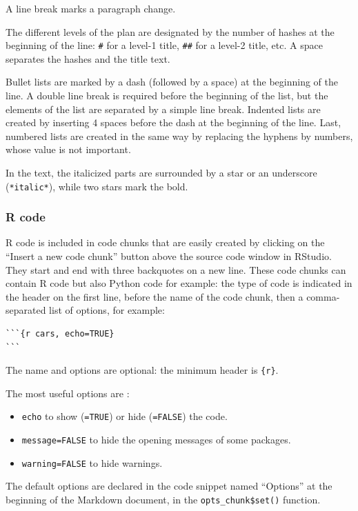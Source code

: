 \documentclass[
  12pt,
  american,
  a4paper,
  extrafontsizes,onecolumn,openright
  ]{memoir}
\providecommand{\tightlist}{%
  \setlength{\itemsep}{0pt}\setlength{\parskip}{0pt}}
\begin{document}
A line break marks a paragraph change.

The different levels of the plan are designated by the number of hashes at the beginning of the line: \texttt{\#} for a level-1 title, \texttt{\#\#} for a level-2 title, etc.
A space separates the hashes and the title text.

Bullet lists are marked by a dash (followed by a space) at the beginning of the line.
A double line break is required before the beginning of the list, but the elements of the list are separated by a simple line break.
Indented lists are created by inserting 4 spaces before the dash at the beginning of the line.
Last, numbered lists are created in the same way by replacing the hyphens by numbers, whose value is not important.

In the text, the italicized parts are surrounded by a star or an underscore (\texttt{*italic*}), while two stars mark the bold.

\subsubsection{R code}\label{r-code}

R code is included in code chunks that are easily created by clicking on the \enquote{Insert a new code chunk} button above the source code window in RStudio.
They start and end with three backquotes on a new line.
These code chunks can contain R code but also Python code for example: the type of code is indicated in the header on the first line, before the name of the code chunk, then a comma-separated list of options, for example:

\begin{verbatim}
```{r cars, echo=TRUE}
```
\end{verbatim}

The name and options are optional: the minimum header is \texttt{\{r\}}.

The most useful options are :

\begin{itemize}
\tightlist
\item
  \texttt{echo} to show (\texttt{=TRUE}) or hide (\texttt{=FALSE}) the code.
\item
  \texttt{message=FALSE} to hide the opening messages of some packages.
\item
  \texttt{warning=FALSE} to hide warnings.
\end{itemize}

The default options are declared in the code snippet named \enquote{Options} at the beginning of the Markdown document, in the \texttt{opts\_chunk\$set()} function.
\end{document}
